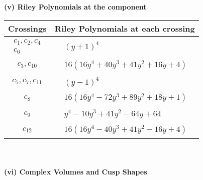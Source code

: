 \documentclass[1p]{elsarticle_modified}
\theoremstyle{definition}
\begin{document}
\newpage\renewcommand{\arraystretch}{1}
\flushleft \textbf{(v) Riley Polynomials at the component}\newline \\
\begin{tabular}{m{50pt}|m{274pt}}
Crossings & \hspace{64pt}Riley Polynomials at each crossing \\
\hline $$\begin{aligned}c_{1},c_{2},c_{4}\\c_{6}\end{aligned}$$&$\begin{aligned}
&(y+1)^4
\end{aligned}$\\
\hline $$\begin{aligned}c_{3},c_{10}\end{aligned}$$&$\begin{aligned}
&16(16 y^4+40 y^3+41 y^2+16 y+4)
\end{aligned}$\\
\hline $$\begin{aligned}c_{5},c_{7},c_{11}\end{aligned}$$&$\begin{aligned}
&(y-1)^4
\end{aligned}$\\
\hline $$\begin{aligned}c_{8}\end{aligned}$$&$\begin{aligned}
&16(16 y^4-72 y^3+89 y^2+18 y+1)
\end{aligned}$\\
\hline $$\begin{aligned}c_{9}\end{aligned}$$&$\begin{aligned}
&y^4-10 y^3+41 y^2-64 y+64
\end{aligned}$\\
\hline $$\begin{aligned}c_{12}\end{aligned}$$&$\begin{aligned}
&16(16 y^4-40 y^3+41 y^2-16 y+4)
\end{aligned}$\\
\hline
\end{tabular}\\~\\
\newpage\flushleft \textbf{(vi) Complex Volumes and Cusp Shapes}
\end{document}
